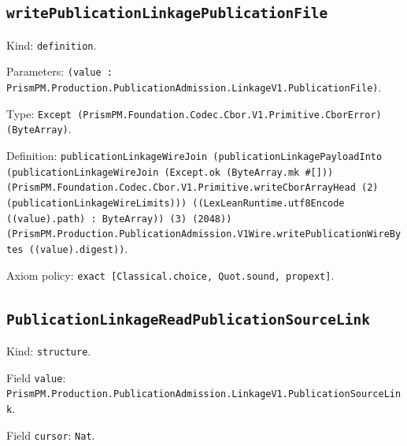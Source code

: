\documentclass[11pt]{article}
\begin{document}
\subsection*{\texttt{writePublicationLinkagePublicationFile}}
\noindent Kind: \texttt{definition}.\par
\noindent Parameters: \texttt{(value : PrismPM.Production.PublicationAdmission.LinkageV1.PublicationFile)}.\par
\noindent Type: \texttt{Except (PrismPM.Foundation.Codec.Cbor.V1.Primitive.CborError) (ByteArray)}.\par
\noindent Definition: \texttt{publicationLinkageWireJoin (publicationLinkagePayloadInto (publicationLinkageWireJoin (Except.ok (ByteArray.mk \#[])) (PrismPM.Foundation.Codec.Cbor.V1.Primitive.writeCborArrayHead (2) (publicationLinkageWireLimits))) ((LexLeanRuntime.utf8Encode ((value).path) : ByteArray)) (3) (2048)) (PrismPM.Production.PublicationAdmission.V1Wire.writePublicationWireBytes ((value).digest))}.\par
\noindent Axiom policy: \texttt{exact [Classical.choice, Quot.sound, propext]}.\par
\subsection*{\texttt{PublicationLinkageReadPublicationSourceLink}}
\noindent Kind: \texttt{structure}.\par
\noindent Field \texttt{value}: \texttt{PrismPM.Production.PublicationAdmission.LinkageV1.PublicationSourceLink}.\par
\noindent Field \texttt{cursor}: \texttt{Nat}.\par
\end{document}
